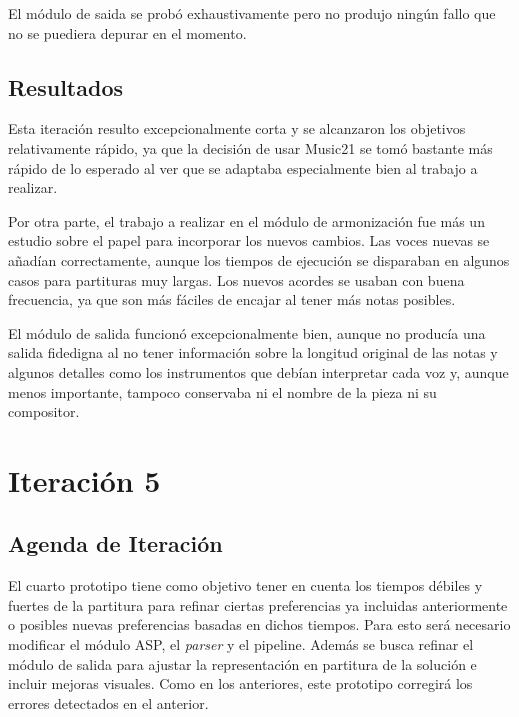 El módulo de saida se probó exhaustivamente pero no produjo ningún fallo que no se puediera depurar en el momento.

\subsection{Resultados}
\label{subsec:fourth_iteration_result}
Esta iteración resulto excepcionalmente corta y se alcanzaron los objetivos relativamente rápido, ya que la decisión de usar Music21 se tomó bastante más rápido de lo esperado al ver que se adaptaba especialmente bien al trabajo a realizar.

Por otra parte, el trabajo a realizar en el módulo de armonización fue más un estudio sobre el papel para incorporar los nuevos cambios. Las voces nuevas se añadían correctamente, aunque los tiempos de ejecución se disparaban en algunos casos para partituras muy largas. Los nuevos acordes se usaban con buena frecuencia, ya que son más fáciles de encajar al tener más notas posibles.

El módulo de salida funcionó excepcionalmente bien, aunque no producía una salida fidedigna al no tener información sobre la longitud original de las notas y algunos detalles como los instrumentos que debían interpretar cada voz y, aunque menos importante, tampoco conservaba ni el nombre de la pieza ni su compositor.

\section{Iteración 5}
\label{sec:fifth_iteration}
\subsection{Agenda de Iteración}
\label{subsec:fifth_iteration_backlog}
El cuarto prototipo tiene como objetivo tener en cuenta los tiempos débiles y fuertes de la partitura para refinar ciertas preferencias ya incluidas anteriormente o posibles nuevas preferencias basadas en dichos tiempos. Para esto será necesario modificar el módulo ASP, el \textit{parser} y el pipeline. Además se busca refinar el módulo de salida para ajustar la representación en partitura de la solución e incluir mejoras visuales. Como en los anteriores, este prototipo corregirá los errores detectados en el anterior.

